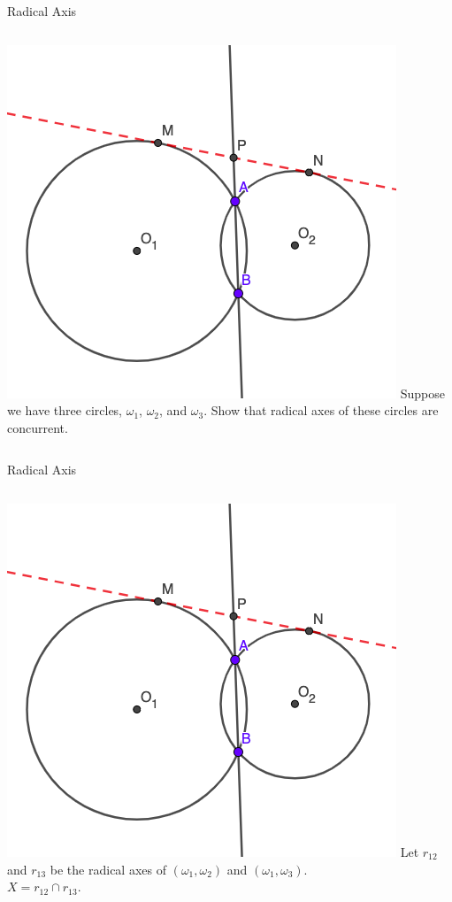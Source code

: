 \documentclass{beamer}
\begin{document}
\begin{frame}{Radical Axis}
	\begin{columns}
		\includegraphics[scale=0.4]{rad3.png}
		Suppose we have three circles, $\omega_1$, $\omega_2$,
		and $\omega_3$. Show that radical axes of these
		circles are concurrent.
	\end{columns}
\end{frame}
\begin{frame}{Radical Axis}
	\begin{columns}
		\column{0.6\textwidth}
		\includegraphics[scale=0.4]{rad3.png}
		\column{0.4\textwidth}
		Let $r_{12}$ and $r_{13}$ be the radical axes of 
		$(\omega_1, \omega_2)$ and $(\omega_1, \omega_3)$.\\
		$X = r_{12}\cap r_{13}$.
	\end{columns}
\end{frame}
\end{document}
